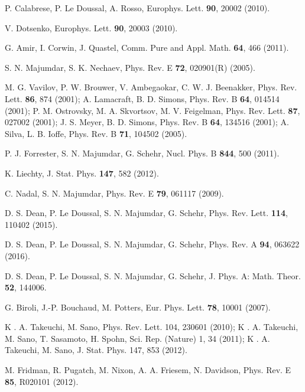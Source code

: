 \documentclass[onecolumn,superscriptaddress,
 amsmath,amssymb,
 aps,
 prd,
]{revtex4-1}
\begin{document}
\begin{thebibliography}{1}
 P. Calabrese, P. Le Doussal, A. Rosso, Europhys. Lett. {\bf 90}, 20002 (2010).

 V. Dotsenko, Europhys. Lett. {\bf 90}, 20003 (2010).

 G. Amir, I. Corwin, J. Quastel, Comm. Pure and Appl. Math. {\bf 64}, 466 (2011).


S. N. Majumdar, S. K. Nechaev, Phys. Rev. E {\bf 72}, 020901(R) (2005).

 M. G. Vavilov, P. W. Brouwer, V. Ambegaokar, C. W. J. Beenakker, Phys. Rev. Lett. {\bf 86}, 874
(2001); A. Lamacraft, B. D. Simons, Phys. Rev. B {\bf 64}, 014514 (2001); P. M. Ostrovsky, M. A. Skvortsov, M. V. Feigelman, Phys. Rev. Lett. {\bf 87}, 027002 (2001); J. S. Meyer, B. D. Simons, Phys. Rev. B {\bf 64}, 134516 (2001); A. Silva, L. B. Ioffe, Phys. Rev. B {\bf 71}, 104502 (2005).

 P. J. Forrester, S. N. Majumdar, G. Schehr, Nucl. Phys. B {\bf 844}, 500 (2011).

 K. Liechty, J. Stat. Phys. {\bf 147}, 582 (2012).

 C. Nadal, S. N. Majumdar, Phys. Rev. E {\bf 79}, 061117 (2009).




D. S. Dean, P. Le Doussal, S. N. Majumdar, G. Schehr, Phys. Rev. Lett. {\bf 114}, 110402 (2015).

D. S. Dean, P. Le Doussal, S. N. Majumdar, G. Schehr, Phys. Rev. A {\bf 94}, 063622 (2016).

D. S. Dean, P. Le Doussal, S. N. Majumdar, G. Schehr, J. Phys. A: Math. Theor. {\bf 52}, 144006.

 G. Biroli, J.-P. Bouchaud, M. Potters, Eur. Phys. Lett. {\bf 78}, 10001 (2007).

 K . A. Takeuchi, M. Sano, Phys. Rev. Lett. 104, 230601 (2010); K . A. Takeuchi, M. Sano, T.
Sasamoto, H. Spohn, Sci. Rep. (Nature) 1, 34 (2011); K . A. Takeuchi, M. Sano, J. Stat. Phys.
147, 853 (2012).

 M. Fridman, R. Pugatch, M. Nixon, A. A. Friesem, N. Davidson, Phys. Rev. E {\bf 85}, R020101 (2012).


\end{thebibliography}
\end{document}
